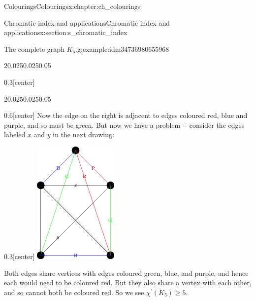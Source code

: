\documentclass[oneside,10pt,]{book}
\numberwithin{equation}{section}
\begin{document}
\begin{chapterptx}{Colourings}{}{Colourings}{}{}{x:chapter:ch_colourings}
\begin{sectionptx}{Chromatic index and applications}{}{Chromatic index and applications}{}{}{x:section:s_chromatic_index}
\begin{example}{The complete graph \(K_5\).}{g:example:idm34736980655968}
\begin{sidebyside}{2}{0.025}{0.025}{0.05}
\begin{sbspanel}{0.3}[center]
\end{sbspanel}%
\end{sidebyside}%
\begin{sidebyside}{2}{0.025}{0.025}{0.05}%
\begin{sbspanel}{0.6}[center]%
Now the edge on the right is adjacent to edges coloured red, blue and purple, and so must be green.  But now we have a problem -{}-{} consider the edges labeled \(x\) and \(y\) in the next drawing:%
\end{sbspanel}%
\begin{sbspanel}{0.3}[center]%
\includegraphics[width=\linewidth]{images/K5EdgeColouring2.png}
\end{sbspanel}%
\end{sidebyside}%
Both edges share vertices with edges coloured green, blue, and purple, and hence each would need to be coloured red.  But they also share a vertex with each other, and so cannot both be coloured red.  So we see \(\chi^\prime(K_5)\geq 5\).%

\end{example}
\end{sectionptx}
\end{chapterptx}
\end{document}
